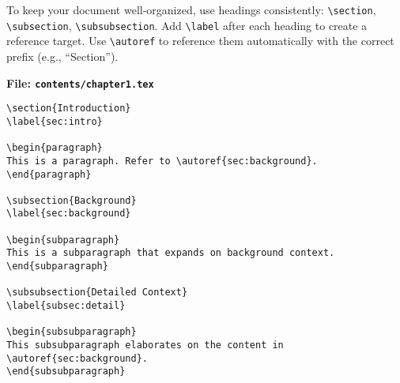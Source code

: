 \documentclass{VISTEC}
\begin{document}
\begin{paragraph}
To keep your document well-organized, use headings consistently: \verb|\section|, \verb|\subsection|, \verb|\subsubsection|. Add \verb|\label| after each heading to create a reference target. Use \verb|\autoref| to reference them automatically with the correct prefix (e.g., ``Section'').
\end{paragraph}

\noindent\textbf{File: \texttt{contents/chapter1.tex}}\vspace{-1.5em}
\begin{verbatim}
\section{Introduction}
\label{sec:intro}

\begin{paragraph}
This is a paragraph. Refer to \autoref{sec:background}.
\end{paragraph}

\subsection{Background}
\label{sec:background}

\begin{subparagraph}
This is a subparagraph that expands on background context.
\end{subparagraph}

\subsubsection{Detailed Context}
\label{subsec:detail}

\begin{subsubparagraph}
This subsubparagraph elaborates on the content in \autoref{sec:background}.
\end{subsubparagraph}
\end{verbatim}

\newpage
\end{document}
